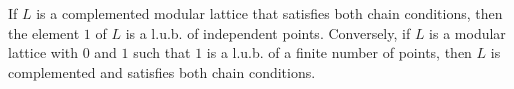 If $L$ is a complemented modular lattice that satisfies both chain conditions, then the element $1$ of $L$ is a l.u.b. of independent points. Conversely, if $L$ is a modular lattice with $0$ and $1$ such that $1$ is a l.u.b. of a finite number of points, then $L$ is complemented and satisfies both chain conditions.
